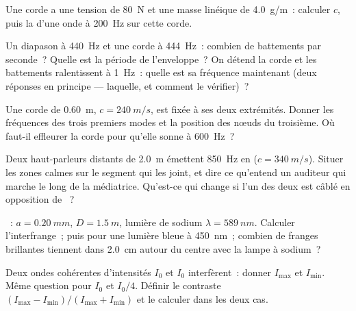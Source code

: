\begin{exercise}[$\star$]\label{exo:b1:wave-propagation:3}
Une corde a une tension de \qty{80}{N} et une masse linéique de
\qty{4.0}{g/m}~: calculer $c$, puis la  d'une onde à
\qty{200}{Hz} sur cette corde.
\end{exercise}

\begin{exercise}[$\star$]\label{exo:b1:wave-propagation:4}
Un diapason à \qty{440}{Hz} et une corde à \qty{444}{Hz}~: combien de
battements par seconde~? Quelle est la période de l'enveloppe~? On
détend la corde et les battements ralentissent à \qty{1}{Hz}~: quelle
est sa fréquence maintenant (deux réponses en principe --- laquelle, et
comment le vérifier)~?
\end{exercise}

\begin{exercise}[$\star\star$]\label{exo:b1:wave-propagation:5}
Une corde de \qty{0.60}{m}, $c = \qty{240}{m/s}$, est fixée à ses deux
extrémités. Donner les fréquences des trois premiers modes et la
position des nœuds du troisième. Où faut-il effleurer la corde pour
qu'elle sonne à \qty{600}{Hz}~?
\end{exercise}

\begin{exercise}[$\star\star$]\label{exo:b1:wave-propagation:6}
Deux haut-parleurs distants de \qty{2.0}{m} émettent \qty{850}{Hz} en
 ($c = \qty{340}{m/s}$). Situer les zones calmes sur le segment qui
les joint, et dire ce qu'entend un auditeur qui marche le long de la
médiatrice. Qu'est-ce qui change si l'un des deux est câblé en
opposition de ~?
\end{exercise}

\begin{exercise}[$\star\star$]\label{exo:b1:wave-propagation:7}
~: $a = \qty{0.20}{mm}$, $D = \qty{1.5}{m}$, lumière de
sodium $\lambda = \qty{589}{nm}$. Calculer l'interfrange~; puis pour une
lumière bleue à \qty{450}{nm}~; combien de franges brillantes tiennent
dans \qty{2.0}{cm} autour du centre avec la lampe à sodium~?
\end{exercise}

\begin{exercise}[$\star\star$]\label{exo:b1:wave-propagation:8}
Deux ondes cohérentes d'intensités $I_0$ et $I_0$ interfèrent~: donner
$I_{\max}$ et $I_{\min}$. Même question pour $I_0$ et $I_0/4$. Définir
le contraste $(I_{\max} - I_{\min})/(I_{\max} + I_{\min})$ et le calculer
dans les deux cas.
\end{exercise}

